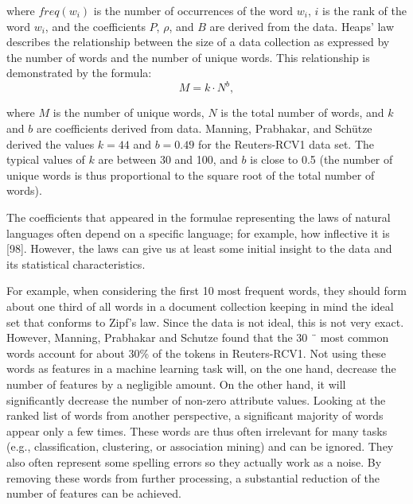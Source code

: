 where $freq(w_i)$ is the number of occurrences of the word $w_i$, $i$ is the rank of
the word $w_i$, and the coefficients $P$, $\rho$, and $B$ are derived from the data.
Heaps’ law \cite{ref114} describes the relationship between the size of a data collection
as expressed by the number of words and the number of unique words. This
relationship is demonstrated by the formula:
\[
M = k \cdot N^{b},
\tag{3.3}
\]

where $M$ is the number of unique words, $N$ is the total number of words,
and $k$ and $b$ are coefficients derived from data. Manning, Prabhakar, and Schütze \cite{ref185}
derived the values $k = 44$ and $b = 0.49$ for the Reuters-RCV1 data set.
The typical values of $k$ are between 30 and 100, and $b$ is close to 0.5 (the number of
unique words is thus proportional to the square root of the total number of
words).

The coefficients that appeared in the formulae representing the laws of natural
languages often depend on a specific language; for example, how inflective it is
[98]. However, the laws can give us at least some initial insight to the data and
its statistical characteristics.

For example, when considering the first 10 most frequent words, they should
form about one third of all words in a document collection keeping in mind
the ideal set that conforms to Zipf’s law. Since the data is not ideal, this is not
very exact. However, Manning, Prabhakar and Schutze \cite{ref185} found that the 30 ¨
most common words account for about 30\% of the tokens in Reuters-RCV1. Not
using these words as features in a machine learning task will, on the one hand,
decrease the number of features by a negligible amount. On the other hand, it
will significantly decrease the number of non-zero attribute values. Looking at
the ranked list of words from another perspective, a significant majority of words
appear only a few times. These words are thus often irrelevant for many tasks
(e.g., classification, clustering, or association mining) and can be ignored. They
also often represent some spelling errors so they actually work as a noise. By
removing these words from further processing, a substantial reduction of the
number of features can be achieved.

